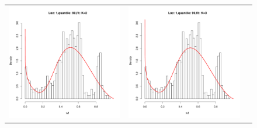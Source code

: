 \documentclass[10pt]{report}
\begin{document}
\begin{figure}[h]
\begin{tabular}{ccc}
\includegraphics[width=\textwidth/3]{../img/loc1/quantile90/fit_K2.pdf}
&
\includegraphics[width=\textwidth/3]{../img/loc1/quantile90/fit_K3.pdf}\\



\end{tabular}
\end{figure}
\end{document}
